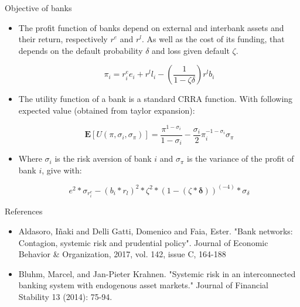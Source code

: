 \documentclass{beamer}
\begin{document}
\begin{frame}{Objective of banks}

    \begin{itemize}
        \item The profit function of banks depend on external and interbank assets and their return, respectively $r^e$ and $r^l$. As well as the cost of its funding, that depends on the default probability $\delta$ and loss given default $\zeta$.
        
        \[\pi_i = r_{i}^e e_i + r^l l_i - (\frac{1}{1 - \zeta \delta}) r^l b_i\]

        \item The utility function of a bank is a standard CRRA function. With following expected value (obtained from taylor expansion):
        
        \[\mathbf{E}[U(\pi, \sigma_i, \sigma_\pi)] = \frac{\pi^{1-\sigma_i}}{1 - \sigma_i} - \frac{\sigma_i}{2} \pi_i^{-1-\sigma_i} \sigma_\pi\]

        \item Where $\sigma_i$ is the risk aversion of bank $i$ and $\sigma_\pi$ is the variance of the profit of bank $i$, give with:
        
        \[ e^2 * \sigma_{r_i^e} - (b_i * r_l)^2 * \zeta^2 * (1 - (\zeta * \mathbf{\delta}))^(-4) * \sigma_\delta\]

    \end{itemize}
    
\end{frame}



\begin{frame}{References}
    \begin{itemize}
        \item  Aldasoro, Iñaki and Delli Gatti, Domenico and Faia, Ester. "Bank networks: Contagion, systemic risk and prudential policy". Journal of Economic Behavior \& Organization, 2017, vol. 142, issue C, 164-188
        \item Bluhm, Marcel, and Jan-Pieter Krahnen. "Systemic risk in an interconnected banking system with endogenous asset markets." Journal of Financial Stability 13 (2014): 75-94.
    \end{itemize}

\end{frame}
    
\end{document}
